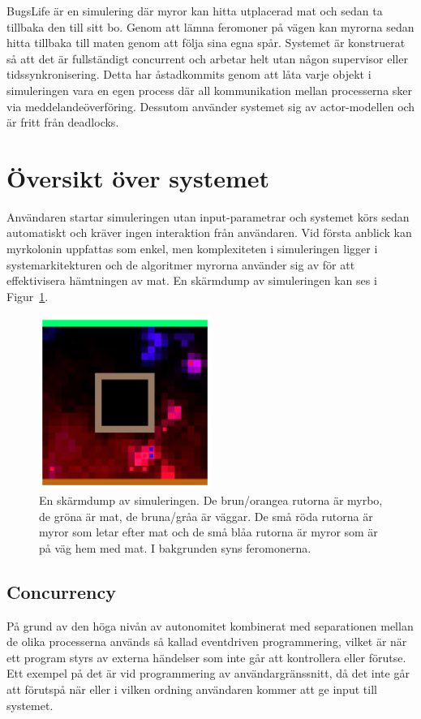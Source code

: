 \documentclass[12pt]{article}
\begin{document}
BugsLife är en simulering där myror kan hitta utplacerad mat och sedan ta tillbaka den till sitt bo.
Genom att lämna feromoner på vägen kan myrorna sedan hitta tillbaka till maten genom att följa sina egna spår.
Systemet är konstruerat så att det är fullständigt concurrent och arbetar helt utan någon supervisor eller tidssynkronisering.
Detta har åstadkommits genom att låta varje objekt i simuleringen vara en egen process där all kommunikation mellan processerna sker via meddelandeöverföring.
Dessutom använder systemet sig av actor-modellen och är fritt från deadlocks.

\section{Översikt över systemet}
Användaren startar simuleringen utan input-parametrar och systemet körs sedan automatiskt och kräver ingen interaktion från användaren.
Vid första anblick kan myrkolonin uppfattas som enkel,
men komplexiteten i simuleringen ligger i systemarkitekturen och de algoritmer myrorna använder sig av för att effektivisera hämtningen av mat.
En skärmdump av simuleringen kan ses i Figur~\ref{fig:screen-dump}.

\begin{figure}
    \centering
    \includegraphics[width=0.5\textwidth]{BugsLife-Fig1.png}
    \caption{
        En skärmdump av simuleringen.
        De brun/orangea rutorna är myrbo,
        de gröna är mat,
        de bruna/gråa är väggar.
        De små röda rutorna är myror som letar efter mat och de små blåa rutorna är myror som är på väg hem med mat.
        I bakgrunden syns feromonerna.
    }\label{fig:screen-dump}
\end{figure}

\subsection{Concurrency}
På grund av den höga nivån av autonomitet kombinerat med separationen mellan de olika processerna används så kallad eventdriven programmering,
vilket är när ett program styrs av externa händelser som inte går att kontrollera eller förutse.
Ett exempel på det är vid programmering av användargränssnitt,
då det inte går att förutspå när eller i vilken ordning användaren kommer att ge input till systemet.
\end{document}
